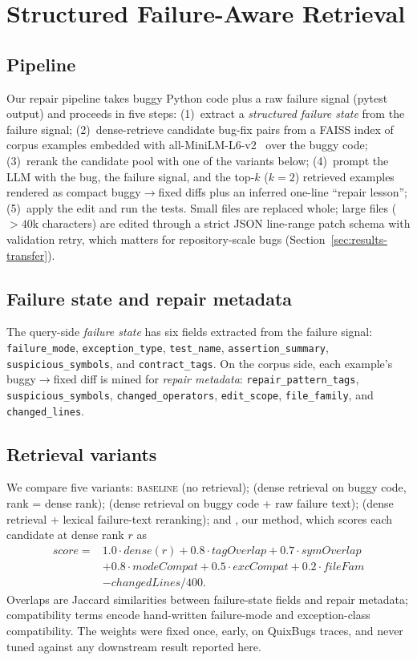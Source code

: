 \section{Structured Failure-Aware Retrieval}
\label{sec:method}

\subsection{Pipeline}
Our repair pipeline takes buggy Python code plus a raw failure signal
(pytest output) and proceeds in five steps: (1)~extract a \emph{structured
failure state} from the failure signal; (2)~dense-retrieve candidate bug-fix
pairs from a FAISS index of corpus examples embedded with
all-MiniLM-L6-v2~\cite{sbert} over the buggy code; (3)~rerank the candidate
pool with one of the variants below; (4)~prompt the LLM with the bug, the
failure signal, and the top-$k$ ($k{=}2$) retrieved examples rendered as
compact buggy$\to$fixed diffs plus an inferred one-line ``repair lesson'';
(5)~apply the edit and run the tests. Small files are replaced whole; large
files (${>}40$k characters) are edited through a strict JSON line-range patch
schema with validation retry, which matters for repository-scale bugs
(Section~\ref{sec:results-transfer}).

\subsection{Failure state and repair metadata}
The query-side \emph{failure state} has six fields extracted from the failure
signal: \texttt{failure\_mode}, \texttt{exception\_type},
\texttt{test\_name}, \texttt{assertion\_summary},
\texttt{suspicious\_symbols}, and \texttt{contract\_tags}. On the corpus
side, each example's buggy$\to$fixed diff is mined for \emph{repair
metadata}: \texttt{repair\_pattern\_tags}, \texttt{suspicious\_symbols},
\texttt{changed\_operators}, \texttt{edit\_scope}, \texttt{file\_family}, and
\texttt{changed\_lines}.

\subsection{Retrieval variants}
We compare five variants: \textsc{baseline} (no retrieval); \codeonly (dense
retrieval on buggy code, rank = dense rank); \rawtext (dense retrieval on
buggy code + raw failure text); \rawrerank (dense retrieval + lexical
failure-text reranking); and \structured, our method, which scores each
candidate at dense rank $r$ as
\begin{align*}
\mathit{score} ={}& 1.0\cdot\mathit{dense}(r)
  + 0.8\cdot\mathit{tagOverlap}
  + 0.7\cdot\mathit{symOverlap} \\
  &+ 0.8\cdot\mathit{modeCompat}
  + 0.5\cdot\mathit{excCompat}
  + 0.2\cdot\mathit{fileFam} \\
  &- \mathit{changedLines}/400 .
\end{align*}
Overlaps are Jaccard similarities between failure-state fields and repair
metadata; compatibility terms encode hand-written failure-mode and
exception-class compatibility. The weights were fixed once, early, on
QuixBugs traces, and never tuned against any downstream result reported here.

